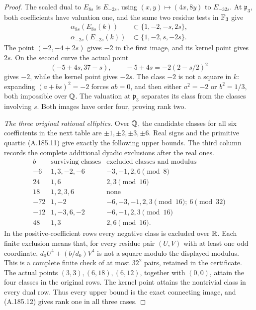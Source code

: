 \begin{proof}
The scaled dual to \(E_{8s}\) is \(E_{-2s}\), using
\((x,y)\mapsto(4x,8y)\) to \(E_{-32s}\).  At
\(\mathfrak p_3\), both coefficients have valuation one,
and the same two residue tests in \(\mathbb F_3\) give
\[
\begin{aligned}
 \alpha_{8s}(E_{8s}(k))&\subset\{1,-2,-s,2s\},\\
 \alpha_{-2s}(E_{-2s}(k))&\subset\{1,-2,s,-2s\}.
\end{aligned}
\tag{A.185.16}
\]
The point \((-2,-4+2s)\) gives \(-2\) in the first image,
and its kernel point gives \(2s\).  On the second curve
the actual point
\[
        (-5+4s,37-s),\qquad
        -5+4s=-2(2-s/2)^2
\tag{A.185.17}
\]
gives \(-2\), while the kernel point gives \(-2s\).
The class \(-2\) is not a square in \(k\): expanding
\((a+bs)^2=-2\) forces \(ab=0\), and then either
\(a^2=-2\) or \(b^2=1/3\), both impossible over \(\mathbb Q\).
The valuation at \(\mathfrak p_3\) separates its class
from the classes involving \(s\).  Both images have order
four, proving rank two.

\emph{The three original rational elliptics.}
Over \(\mathbb Q\), the candidate classes for all six coefficients
in the next table are \(\pm1,\pm2,\pm3,\pm6\).
Real signs and the primitive quartic (A.185.11) give exactly
the following upper bounds.  The third column records the
complete additional dyadic exclusions after the real ones.
\[
\begin{array}{r|l|l}
 b&\text{surviving classes}&\text{excluded classes and modulus}\\ \hline
 -6&1,3,-2,-6&-3,-1,2,6\pmod8\\
 24&1,6&2,3\pmod{16}\\
 18&1,2,3,6&\text{none}\\
 -72&1,-2&-6,-3,-1,2,3\pmod{16};\ 6\pmod{32}\\
 -12&1,-3,6,-2&-6,-1,2,3\pmod{16}\\
 48&1,3&2,6\pmod{16}.
\end{array}
\tag{A.185.18}
\]
In the positive-coefficient rows every negative class is
excluded over \(\mathbb R\).  Each finite exclusion means that,
for every residue pair \((U,V)\) with at least one odd
coordinate, \(d_0U^4+(b/d_0)V^4\) is not a square modulo
the displayed modulus.  This is a complete finite check of
at most \(32^2\) pairs, retained in the certificate.
The actual points \((3,3),(6,18),(6,12)\), together with
\((0,0)\), attain the four classes in the original rows.
The kernel point attains the nontrivial class in every dual
row.  Thus every upper bound is the exact connecting image,
and (A.185.12) gives rank one in all three cases.


\end{proof}
